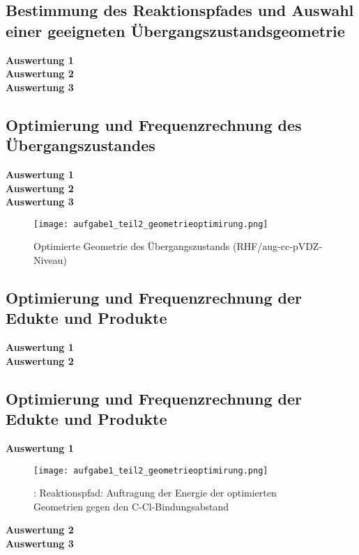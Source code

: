 \documentclass[12pt]{article}
\begin{document}
\subsection{Bestimmung des Reaktionspfades und Auswahl einer geeigneten Übergangszustandsgeometrie}
\textbf{Auswertung 1}\\
\textbf{Auswertung 2}\\
\textbf{Auswertung 3}

\subsection{Optimierung und Frequenzrechnung des Übergangszustandes}
\textbf{Auswertung 1}\\
\textbf{Auswertung 2}\\
\textbf{Auswertung 3}
\begin{figure}[!htpb]
\centering
  \texttt{[image: aufgabe1\_teil2\_geometrieoptimirung.png]}%
  \caption{Optimierte Geometrie des Übergangszustands (RHF/aug-cc-pVDZ-Niveau)}
\end{figure}
\newpage
\subsection{Optimierung und Frequenzrechnung der Edukte und Produkte}
\textbf{Auswertung 1}\\
\textbf{Auswertung 2}\\
\subsection{Optimierung und Frequenzrechnung der Edukte und Produkte}
\textbf{Auswertung 1}\\
\begin{figure}[!htpb]
\centering
  \texttt{[image: aufgabe1\_teil2\_geometrieoptimirung.png]}%
  \caption{: Reaktionspfad: Auftragung der Energie der optimierten Geometrien gegen den C-Cl-Bindungsabstand}
\end{figure}
\noindent
\textbf{Auswertung 2}\\
\textbf{Auswertung 3}\\
\end{document}
